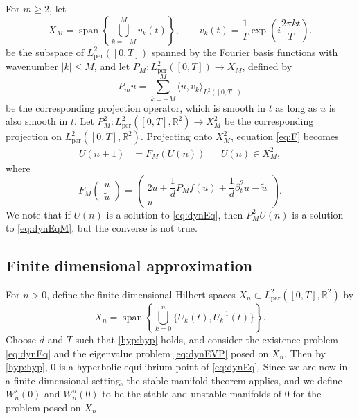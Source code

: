 \documentclass[12pt,reqno]{amsart}
\def\R{{\mathbb R}}
\def\per{\textrm{per}}
\DeclareMathOperator{\spn}{span}
\begin{document}
For $m \geq 2$, let 
\begin{equation}\label{eq:XM}
X_M = \spn\left\{ \bigcup_{k = -M}^M v_k(t) \right\}, \qquad
v_k(t) = \frac{1}{T} \exp\left( i \frac{2 \pi k t}{T} \right).
\end{equation}
be the subspace of $L_\per^2([0,T])$ spanned by the Fourier basis functions with wavenumber $|k| \leq M$, and let $P_M: L_\per^2([0,T]) \rightarrow X_M$, defined by
\begin{equation}\label{eq:PM}
P_m u = \sum_{k=-M}^M \langle u, v_k \rangle_{L^2([0,T])}
\end{equation}
be the corresponding projection operator, which is smooth in $t$ as long as $u$ is also smooth in $t$. Let $P_M^2: L_\per^2([0,T],\R^2) \rightarrow X_M^2$ be the corresponding projection on $L_\per^2([0,T],\R^2)$. Projecting onto $X_M^2$, equation \cref{eq:F} becomes 
\begin{align}\label{eq:dynEqM}
U(n+1) &= F_M(U(n)) && U(n) \in X_M^2,
\end{align}
where
\begin{equation}\label{eq:FM}
F_M\begin{pmatrix}u \\ \tilde{u} \end{pmatrix} = 
\begin{pmatrix}2u  + \dfrac{1}{d}P_M f(u) + \dfrac{1}{d} \partial_t^2 u - \tilde{u} \\
u
\end{pmatrix}.
\end{equation}
We note that if $U(n)$ is a solution to \cref{eq:dynEq}, then $P_M^2 U(n)$ is a solution to \cref{eq:dynEqM}, but the converse is not true. 

\subsection{Finite dimensional approximation}

For $n > 0$, define the finite dimensional Hilbert spaces $X_n \subset L^2_\per([0,T],\R^2)$ by 
\begin{equation}
X_n = \spn\left\{ \bigcup_{k=0}^n \{U_k(t) , U_k^{-1}(t) \} \right\}.
\end{equation}
Choose $d$ and $T$ such that \cref{hyp:hyp} holds, and consider the existence problem \cref{eq:dynEq} and the eigenvalue problem \cref{eq:dynEVP} posed on $X_n$. Then by \cref{hyp:hyp}, 0 is a hyperbolic equilibrium point of \cref{eq:dynEq}. Since we are now in a finite dimensional setting, the stable manifold theorem applies, and we define $W_n^s(0)$ and $W_n^u(0)$ to be the stable and unstable manifolds of 0 for the problem posed on $X_n$. 
\end{document}
